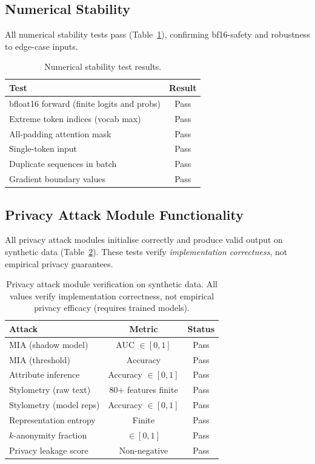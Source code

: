 \documentclass{article}
\begin{document}
\subsection{Numerical Stability}

All numerical stability tests pass (Table~\ref{tab:numerics}),
confirming bf16-safety and robustness to edge-case inputs.

\begin{table}[h]
  \centering
  \caption{Numerical stability test results.}
  \label{tab:numerics}
  \begin{tabular}{lc}
    \toprule
    \textbf{Test} & \textbf{Result} \\
    \midrule
    bfloat16 forward (finite logits and probs) & Pass \\
    Extreme token indices (vocab max) & Pass \\
    All-padding attention mask & Pass \\
    Single-token input & Pass \\
    Duplicate sequences in batch & Pass \\
    Gradient boundary values & Pass \\
    \bottomrule
  \end{tabular}
\end{table}

\subsection{Privacy Attack Module Functionality}

All privacy attack modules initialise correctly and produce valid
output on synthetic data (Table~\ref{tab:attacks}).
These tests verify \emph{implementation correctness}, not empirical
privacy guarantees.

\begin{table}[h]
  \centering
  \caption{Privacy attack module verification on synthetic data.
           All values verify implementation correctness, not empirical
           privacy efficacy (requires trained models).}
  \label{tab:attacks}
  \begin{tabular}{lcc}
    \toprule
    \textbf{Attack} & \textbf{Metric} & \textbf{Status} \\
    \midrule
    MIA (shadow model) & AUC $\in [0,1]$ & Pass \\
    MIA (threshold) & Accuracy & Pass \\
    Attribute inference & Accuracy $\in [0,1]$ & Pass \\
    Stylometry (raw text) & 80+ features finite & Pass \\
    Stylometry (model reps) & Accuracy $\in [0,1]$ & Pass \\
    Representation entropy & Finite & Pass \\
    $k$-anonymity fraction & $\in [0,1]$ & Pass \\
    Privacy leakage score & Non-negative & Pass \\
    \bottomrule
  \end{tabular}
\end{table}
\end{document}
